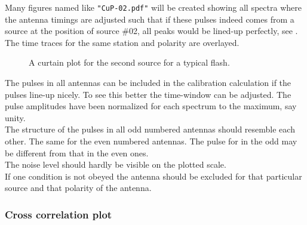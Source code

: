 Many figures named like \verb!"CuP-02.pdf"! will be created showing all spectra where the antenna timings are adjusted such that if these pulses indeed comes from a source at the position of source \#02, all peaks would be lined-up perfectly, see . The time traces for the same station and polarity are overlayed.

\begin{figure}[th]
	\caption{A curtain plot for the second source for a typical flash.}	 
\end{figure}

The pulses in all antennas can be included in the calibration calculation if the pulses line-up nicely. To see this better the time-window can be adjusted. The pulse amplitudes have been normalized for each spectrum to the maximum, say unity.
\\The structure of the pulses in all odd numbered antennas should resemble each other. The same for the even numbered antennas. The pulse for in the odd may be different from that in the even ones.
\\The noise level should hardly be visible on the plotted scale.
\\If one condition is not obeyed the antenna should be excluded for that particular source and that polarity of the antenna.

\subsubsection{Cross correlation plot}

